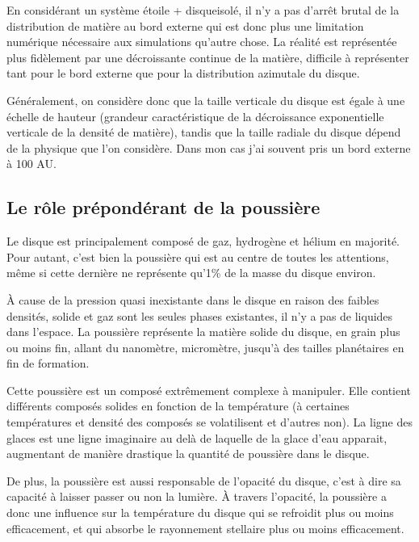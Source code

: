 \bigskip

En considérant un système \og étoile + disque\fg isolé, il n'y a pas d'arrêt brutal de la distribution de matière au bord externe qui est donc plus une limitation numérique nécessaire aux simulations qu'autre chose. La réalité est représentée plus fidèlement par une décroissante continue de la matière, difficile à représenter tant pour le bord externe que pour la distribution azimutale du disque. 

Généralement, on considère donc que la taille verticale du disque est égale à une échelle de hauteur (grandeur caractéristique de la décroissance exponentielle verticale de la densité de matière), tandis que la taille radiale du disque dépend de la physique que l'on considère. Dans mon cas j'ai souvent pris un bord externe à 100 AU.



\subsection{Le rôle prépondérant de la poussière}
Le disque est principalement composé de gaz, hydrogène et hélium en majorité. Pour autant, c'est bien la poussière qui est au centre de toutes les attentions, même si cette dernière ne représente qu'1\% de la masse du disque environ.

À cause de la pression quasi inexistante dans le disque en raison des faibles densités, solide et gaz sont les seules phases existantes, il n'y a pas de liquides dans l'espace. La poussière représente la matière solide du disque, en grain plus ou moins fin, allant du nanomètre, micromètre, jusqu'à des tailles planétaires en fin de formation. 

Cette poussière est un composé extrêmement complexe à manipuler. Elle contient différents composés solides en fonction de la température (à certaines températures et densité des composés se volatilisent et d'autres non). La ligne des glaces est une ligne imaginaire au delà de laquelle de la glace d'eau apparait, augmentant de manière drastique la quantité de poussière dans le disque. 

\bigskip

De plus, la poussière est aussi responsable de l'opacité du disque, c'est à dire sa capacité à laisser passer ou non la lumière. À travers l'opacité, la poussière a donc une influence sur la température du disque qui se refroidit plus ou moins efficacement, et qui absorbe le rayonnement stellaire plus ou moins efficacement. 


